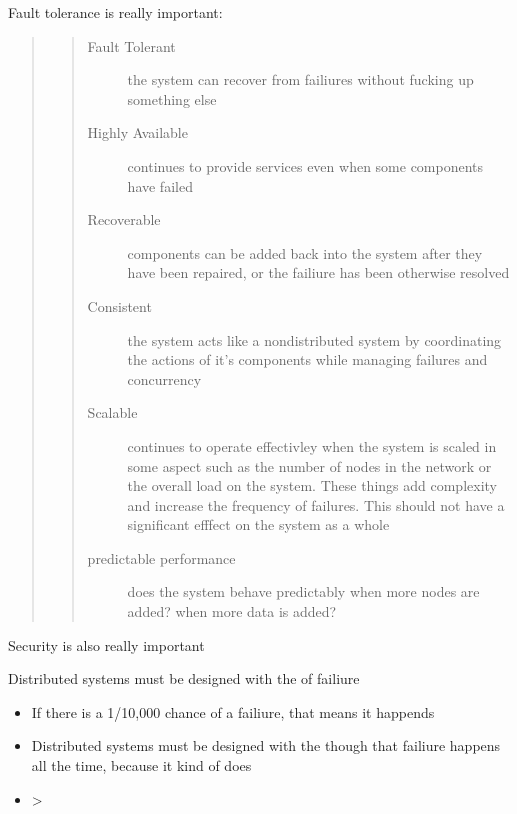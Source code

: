 \documentclass[letterpaper,10pt,english]{sphinxmanual}
\begin{document}
Fault tolerance is really important:
\begin{quote}
\begin{quote}\begin{description}
\item[{Fault Tolerant}] \leavevmode
the system can recover from failiures without
fucking up something else

\item[{Highly Available}] \leavevmode
continues to provide services even when some
components have failed

\item[{Recoverable}] \leavevmode
components can be added back into the system after
they have been repaired, or the failiure has been otherwise
resolved

\item[{Consistent}] \leavevmode
the system acts like a non\sphinxhyphen{}distributed system by co\sphinxhyphen{}ordinating
the actions of it’s components while managing failures and concurrency

\item[{Scalable}] \leavevmode
continues to operate effectivley when the system is scaled in
some aspect such as the number of nodes in the network or the overall
load on the system. These things add complexity and increase the frequency
of failures. This should not have a significant efffect on the system
as a whole

\item[{predictable performance}] \leavevmode
does the system behave predictably when
more nodes are added? when more data is added?

\end{description}\end{quote}
\end{quote}

Security is also really important

Distributed systems must be designed with the  of failiure
\begin{itemize}
\item {} 
If there is a 1/10,000 chance of a failiure, that means it happends 

\item {} 
Distributed systems must be designed with the though that failiure happens
all the time, because it kind of does

\item {} 
\textendash{}\textgreater{} 

\end{itemize}
\end{document}
